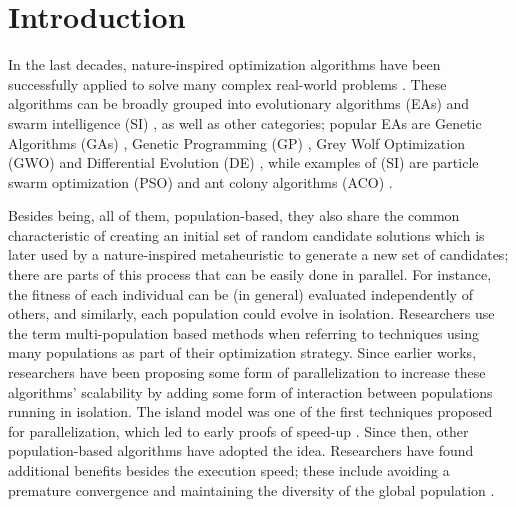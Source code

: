 \documentclass[review]{elsarticle}
\begin{document}
\linenumbers

\section{Introduction}

In the last decades, nature-inspired optimization algorithms have been successfully
applied to solve many complex real-world problems
\cite{yang2014nature}. These algorithms can be broadly grouped into evolutionary algorithms (EAs)
\cite{back1996evolutionary} and swarm intelligence (SI)
\cite{kennedy2006swarm}, as well as other categories; popular EAs
are Genetic Algorithms (GAs) \cite{holland1992adaptation,eiben2003genetic},
Genetic Programming (GP) \cite{back1996evolutionary}, Grey Wolf Optimization
(GWO) \cite{mirjalili2014grey} and Differential Evolution (DE) \cite{karabouga2004simple},
while examples of (SI) \cite{kennedy2006swarm} are particle swarm
optimization (PSO) \cite{clerc2010particle} and ant colony algorithms (ACO) \cite{dorigo1999ant}.

Besides being, all of them, population-based, they also share the
common characteristic of creating an initial set of random candidate
solutions which is later used by a nature-inspired metaheuristic to
generate a new set of candidates; there are parts of this process that
can be easily done in parallel. For instance, the fitness of each
individual can be (in general) evaluated independently of others, and
similarly, each population could evolve in isolation. Researchers use
the term multi-population based methods when referring to techniques
using many populations as part of their optimization strategy.  Since
earlier works, researchers have been proposing some form of
parallelization \cite{muhlenbein1988evolution} to increase these
algorithms' scalability by adding some form of interaction between
populations running in isolation.  The island model was one of the
first techniques proposed for parallelization, which led to early
proofs of speed-up \cite{gorges1990explicit,grosso1985computer}.
Since then, other population-based algorithms have adopted the idea.
Researchers have found additional benefits besides the execution
speed; these include avoiding a premature convergence and maintaining
the diversity of the global population \cite{li2015multi}.
\end{document}
